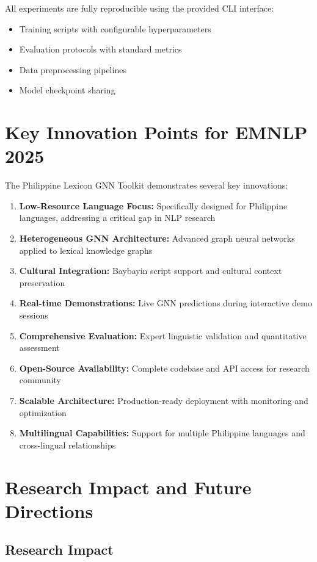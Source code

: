 \documentclass[11pt]{article}
\begin{document}
All experiments are fully reproducible using the provided CLI interface:
\begin{itemize}
    \item Training scripts with configurable hyperparameters
    \item Evaluation protocols with standard metrics
    \item Data preprocessing pipelines
    \item Model checkpoint sharing
\end{itemize}

\section{Key Innovation Points for EMNLP 2025}

The Philippine Lexicon GNN Toolkit demonstrates several key innovations:

\begin{enumerate}[label=\arabic*)]
    \item \textbf{Low-Resource Language Focus:} Specifically designed for Philippine languages, addressing a critical gap in NLP research
    \item \textbf{Heterogeneous GNN Architecture:} Advanced graph neural networks applied to lexical knowledge graphs
    \item \textbf{Cultural Integration:} Baybayin script support and cultural context preservation
    \item \textbf{Real-time Demonstrations:} Live GNN predictions during interactive demo sessions
    \item \textbf{Comprehensive Evaluation:} Expert linguistic validation and quantitative assessment
    \item \textbf{Open-Source Availability:} Complete codebase and API access for research community
    \item \textbf{Scalable Architecture:} Production-ready deployment with monitoring and optimization
    \item \textbf{Multilingual Capabilities:} Support for multiple Philippine languages and cross-lingual relationships
\end{enumerate}

\section{Research Impact and Future Directions}

\subsection{Research Impact}
\end{document}
